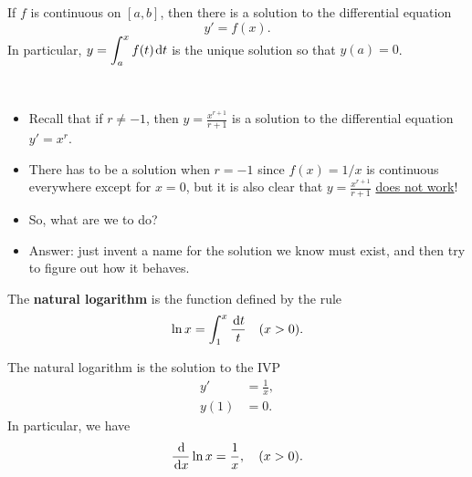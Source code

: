 \setcounter{chapter}{7}
\setcounter{section}{2}
\setcounter{theorem}{0}
\setcounter{equation}{0}


\begin{theorem}
If $f$ is continuous on $[a,b]$, then there is a solution to the differential equation
\begin{equation*}
y'=f(x).
\end{equation*}
In particular, $y=\displaystyle\int_a^xf(t)\mkern 2mu \mathrm{d} t$ is the unique solution so that $y(a)=0$.
\end{theorem}

\begin{remark}\,
\begin{itemize}
\item Recall that if $r\ne -1$, then $y= \frac{x^{r+1}}{r+1}$ is a solution to the differential equation $y'=x^r$.
\item There has to be a solution when $r=-1$ since $f(x)=1/x$ is continuous everywhere except for $x=0$, but it is also clear that $y=\frac{x^{r+1}}{r+1}$ \underline{does not work}!
\item So, what are we to do?
\item Answer: just invent a name for the solution we know must exist, and then try to figure out how it behaves.
\end{itemize}
\end{remark}

\begin{definition}
The \textbf{natural logarithm} is the function defined by the rule
\begin{equation*}
\ln x = \int_1^x\frac{\mkern 2mu \mathrm{d} t}{t}\quad (x>0).
\end{equation*}
\end{definition}

\begin{corollary}
The natural logarithm is the solution to the IVP
\begin{align*}
y' & = \frac{1}{x},\\
y(1) &=0.
\end{align*}
In particular, we have
\begin{equation*}
\frac{\mkern 2mu \mathrm{d}}{\mkern 2mu \mathrm{d} x}\ln x = \frac{1}{x},\quad (x>0).
\end{equation*}
\end{corollary}

